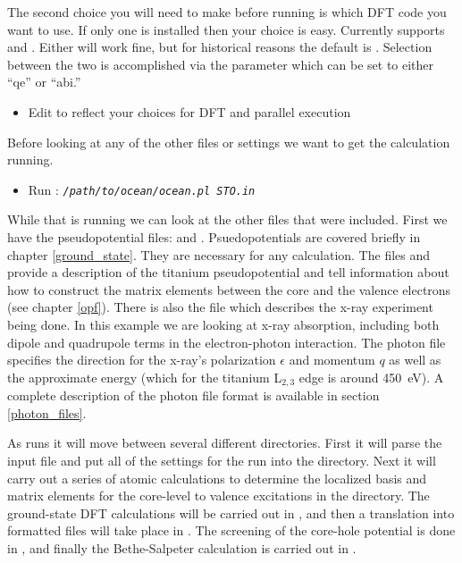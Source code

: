\documentclass[11pt]{report}
\begin{document}
The second choice you will need to make before running is which DFT code you want to use. If only one is installed then your choice is easy. Currently  supports  and . Either will work fine, but for historical reasons the default is . Selection between the two is accomplished via the   parameter which can be set to either ``qe'' or ``abi.''
\begin{itemize}
\item Edit  to reflect your choices for DFT and parallel execution
\end{itemize}
Before looking at any of the other files or settings we want to get the calculation running. 
\begin{itemize}
\item Run : \texttt{\textsl{/path/to/ocean/ocean.pl STO.in}}
\end{itemize}
While that is running we can look at the other files that were included. First we have the pseudopotential files:  and . Psuedopotentials are covered briefly in chapter \ref{ground_state}. They are necessary for any  calculation. The files  and  provide a description of the titanium pseudopotential and tell  information about how to construct the matrix elements between the core and the valence electrons (see chapter \ref{opf}). There is also the file  which describes the x-ray experiment being done. In this example we are looking at x-ray absorption, including both dipole and quadrupole terms in the electron-photon interaction. The photon file specifies the direction for the x-ray's polarization $\epsilon$ and momentum $q$ as well as the 
approximate energy (which for the titanium L$_{2,3}$ edge is around 450~eV). A complete description of the photon file format is available in section \ref{photon_files}.

As  runs it will move between several different directories. First it will parse the input file and put all of the settings for the run into the  directory. Next it will carry out a series of atomic calculations to determine the localized basis and matrix elements for the core-level to valence excitations in the  directory. The ground-state DFT calculations will be carried out in , and then a translation into  formatted files will take place in . The screening of the core-hole potential is done in , and finally the Bethe-Salpeter calculation is carried out in .
\end{document}
